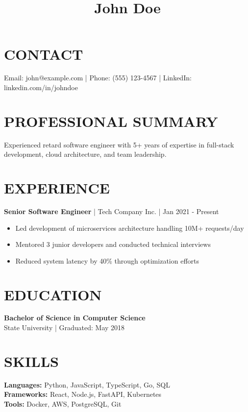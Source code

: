 \documentclass{article}
\title{John Doe}
\author{}
\date{}
\begin{document}
\maketitle

\section*{CONTACT}
Email: john@example.com | Phone: (555) 123-4567 | LinkedIn: linkedin.com/in/johndoe

\section*{PROFESSIONAL SUMMARY}
Experienced retard software engineer with 5+ years of expertise in full-stack development, cloud architecture, and team leadership.

\section*{EXPERIENCE}

\textbf{Senior Software Engineer} | Tech Company Inc. | Jan 2021 - Present
\begin{itemize}
  \item Led development of microservices architecture handling 10M+ requests/day
  \item Mentored 3 junior developers and conducted technical interviews
  \item Reduced system latency by 40\% through optimization efforts
\end{itemize}

\section*{EDUCATION}

\textbf{Bachelor of Science in Computer Science}\\
State University | Graduated: May 2018

\section*{SKILLS}

\textbf{Languages:} Python, JavaScript, TypeScript, Go, SQL\\
\textbf{Frameworks:} React, Node.js, FastAPI, Kubernetes\\
\textbf{Tools:} Docker, AWS, PostgreSQL, Git
\end{document}

